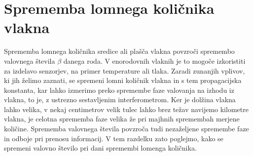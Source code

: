 \section{Sprememba lomnega količnika vlakna}

Sprememba lomnega količnika sredice ali plašča vlakna povzroči spremembo
valovnega števila $\beta$ danega roda. V enorodovnih vlaknih je to
mogoče izkoristiti za izdelavo senzorjev, na primer temperature ali
tlaka. Zaradi zunanjih vplivov, ki jih želimo zaznati, se spremeni
lomni količnik vlakna in s tem propagacijska konstanta, kar lahko
izmerimo preko spremembe faze valovanja na izhodu iz vlakna, to je,
z ustrezno sestavljenim interferometrom. Ker je dolžina vlakna lahko
velika, v nekaj centimetrov velik tulec lahko brez težav navijemo
kilometre vlakna, je celotna sprememba faze velika že pri majhnih
spremembah merjene količine. Sprememba valovnega števila povzroča
tudi nezaželjene spremembe faze in odboje pri prenosu informacij.
V tem razdelku zato poglejmo, kako se spremeni valovno število pri
dani spremembi lomenga količnika.

